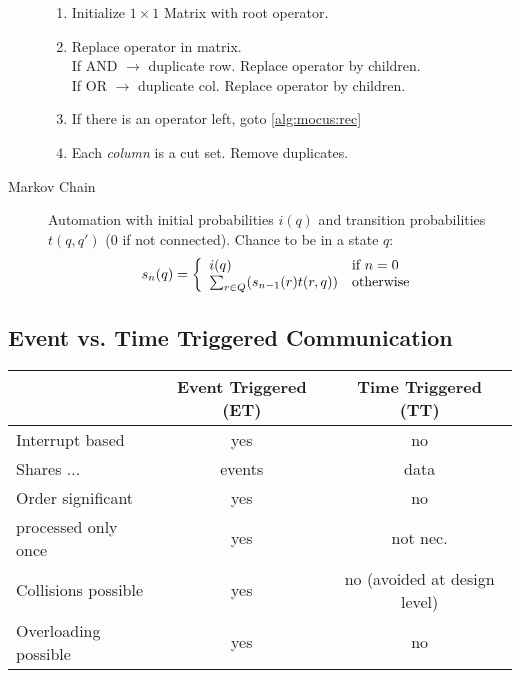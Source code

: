 \begin{description}
    \begin{enumerate}
        \item Initialize $1 \times 1$ Matrix with root operator.
        \item \label{alg:mocus:rec} Replace operator in matrix. \\
        If AND $\rightarrow$ duplicate row. Replace operator by children.\\
        If OR  $\rightarrow$ duplicate col. Replace operator by children.
        \item If there is an operator left, goto \ref{alg:mocus:rec}\\
        \item Each \emph{column} is a cut set. Remove duplicates.
    \end{enumerate}
    \item[Markov Chain] Automation with initial probabilities $i(q)$ and
    transition probabilities $t(q, q')$ (0 if not connected). Chance to be in a
    state $q$:
    \[ s_n(q) = \left\{ \begin{array}{ll} i(q) & \mbox{if } n = 0 \\ \sum_{r \in Q}(s_{n-1}(r)t(r,q)) & \mbox{otherwise} \end{array} \right. \]
\end{description}

\subsection{Event vs. Time Triggered Communication}
\begin{tabular}{l |c | c}
                    & Event Triggered (ET)  & Time Triggered (TT) \\
\hline
Interrupt based     & yes                   & no \\
Shares ...          & events                & data\\
Order significant   & yes                   & no\\
processed only once & yes                   & not nec.\\
Collisions possible & yes                   & no (avoided at design level)\\
Overloading possible& yes                   & no
\end{tabular}

